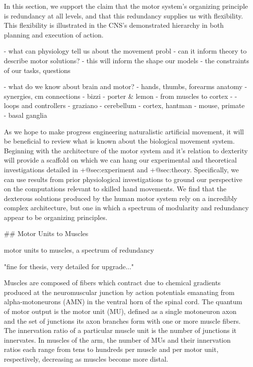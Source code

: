 \documentclass[../main.tex]{subfiles}
\begin{document}
 In this section, we support the claim that the motor system's organizing principle is redundancy at all levels, and that this redundancy supplies us with flexibility. This flexibility is illustrated in the CNS's demonstrated hierarchy in both planning and execution of action. 

 - what can physiology tell us about the movement probl
  - can it inform theory to describe motor solutions?
  - this will inform the shape our models
  - the constraints of our tasks, questions
  
- what do we know about brain and motor?
  - hands, thumbs, forearms anatomy
  - synergies, cm connections
    - bizzi
    - porter & lemon
    - from muscles to cortex
    - 
- loops and controllers
  - graziano
  - cerebellum
  - cortex, hantman
  - mouse, primate
  - basal ganglia 

 As we hope to make progress engineering naturalistic artificial movement, it will be beneficial to review what is known about the biological movement system. Beginning with the architecture of the motor system and it's relation to dexterity will provide a scaffold on which we can hang our experimental and theoretical investigations detailed in {+@sec:experiment} and {+@sec:theory}. Specifically, we can use results from prior physiological investigations to ground our perspective on the computations relevant to skilled hand movements. We find that the dexterous solutions produced by the human motor system rely on a incredibly complex architecture, but one in which a spectrum of modularity and redundancy appear to be organizing principles. 

## Motor Units to Muscles

 motor units to muscles, a spectrum of redundancy 

 "fine for thesis, very detailed for upgrade..." 

 Muscles are composed of fibers which contract due to chemical gradients produced at the neuromuscular junction by action potentials emanating from alpha-motoneurons (AMN) in the ventral horn of the spinal cord. The quantum of motor output is the motor unit (MU), defined as a single motoneuron axon and the set of junctions its axon branches form with one or more muscle fibers. The innervation ratio of a particular muscle unit is the number of junctions it innervates. In muscles of the arm, the number of MUs and their innervation ratios each range from tens to hundreds per muscle and per motor unit, respectively, decreasing as muscles become more distal. 
\end{document}
